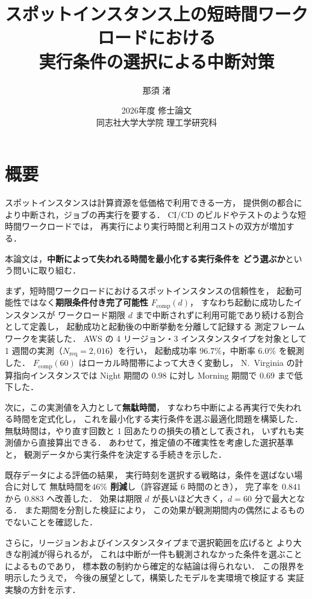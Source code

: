 \documentclass[11pt,a4paper]{ltjsreport}
\title{\vspace{-10mm}
スポットインスタンス上の短時間ワークロードにおける\\
実行条件の選択による中断対策}
\author{那須 渚}
\date{2026年度 修士論文\\[2mm] 同志社大学大学院 理工学研究科}
\newcommand{\Fcomp}{F_{\mathrm{comp}}}
\newcommand{\Nreq}{N_{\mathrm{req}}}
\begin{document}
\maketitle

\chapter*{概要}

スポットインスタンスは計算資源を低価格で利用できる一方，
提供側の都合により中断され，ジョブの再実行を要する．
CI/CD のビルドやテストのような短時間ワークロードでは，
再実行により実行時間と利用コストの双方が増加する．

本論文は，\textbf{中断によって失われる時間を最小化する実行条件を
どう選ぶか}という問いに取り組む．

まず，短時間ワークロードにおけるスポットインスタンスの信頼性を，
起動可能性ではなく\textbf{期限条件付き完了可能性} $\Fcomp(d)$，
すなわち起動に成功したインスタンスが
ワークロード期限 $d$ まで中断されずに利用可能であり続ける割合として定義し，
起動成功と起動後の中断挙動を分離して記録する
測定フレームワークを実装した．
AWS の 4 リージョン・3 インスタンスタイプを対象として
1 週間の実測（$\Nreq = 2{,}016$）を行い，
起動成功率 $96.7\%$，中断率 $6.0\%$ を観測した．
$\Fcomp(60)$ はローカル時間帯によって大きく変動し，
N.~Virginia の計算指向インスタンスでは
Night 期間の $0.98$ に対し Morning 期間で $0.69$ まで低下した．

次に，この実測値を入力として\textbf{無駄時間}，
すなわち中断による再実行で失われる時間を定式化し，
これを最小化する実行条件を選ぶ最適化問題を構築した．
無駄時間は，やり直す回数と 1 回あたりの損失の積として表され，
いずれも実測値から直接算出できる．
あわせて，推定値の不確実性を考慮した選択基準と，
観測データから実行条件を決定する手続きを示した．

既存データによる評価の結果，
実行時刻を選択する戦略は，条件を選ばない場合に対して
無駄時間を\textbf{$46\%$ 削減}し（許容遅延 6 時間のとき），
完了率を $0.841$ から $0.883$ へ改善した．
効果は期限 $d$ が長いほど大きく，$d = 60$ 分で最大となる．
また期間を分割した検証により，
この効果が観測期間内の偶然によるものでないことを確認した．

さらに，リージョンおよびインスタンスタイプまで選択範囲を広げると
より大きな削減が得られるが，
これは中断が一件も観測されなかった条件を選ぶことによるものであり，
標本数の制約から確定的な結論は得られない．
この限界を明示したうえで，
今後の展望として，構築したモデルを実環境で検証する
実証実験の方針を示す．
\end{document}
